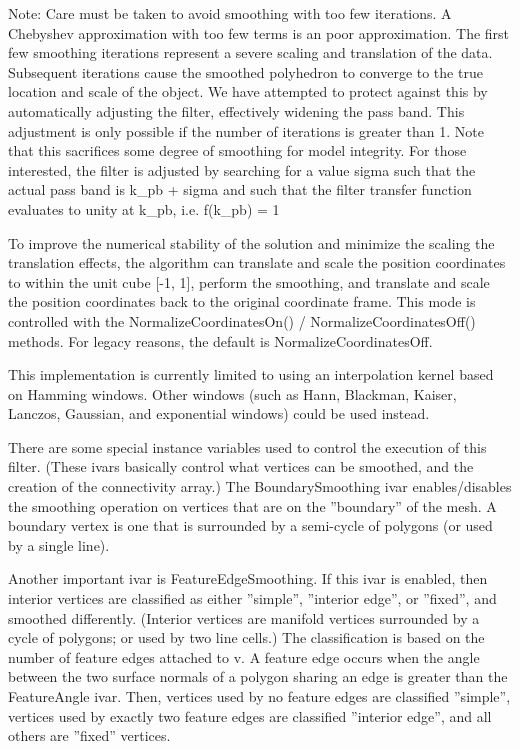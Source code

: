  Note: Care must be taken to avoid smoothing with too few iterations.
 A Chebyshev approximation with too few terms is an poor approximation.
 The first few smoothing iterations represent a severe scaling and
 translation of the data.  Subsequent iterations cause the smoothed
 polyhedron to converge to the true location and scale of the object.
 We have attempted to protect against this by automatically adjusting
 the filter, effectively widening the pass band. This adjustment is only
 possible if the number of iterations is greater than 1.  Note that this
 sacrifices some degree of smoothing for model integrity. For those
 interested, the filter is adjusted by searching for a value sigma
 such that the actual pass band is k\_pb + sigma and such that the
 filter transfer function evaluates to unity at k\_pb, i.e. f(k\_pb) = 1

 To improve the numerical stability of the solution and minimize the
 scaling the translation effects, the algorithm can translate and
 scale the position coordinates to within the unit cube [-1, 1],
 perform the smoothing, and translate and scale the position
 coordinates back to the original coordinate frame.  This mode is
 controlled with the NormalizeCoordinatesOn() /
 NormalizeCoordinatesOff() methods.  For legacy reasons, the default
 is NormalizeCoordinatesOff.

 This implementation is currently limited to using an interpolation
 kernel based on Hamming windows.  Other windows (such as Hann, Blackman,
 Kaiser, Lanczos, Gaussian, and exponential windows) could be used
 instead.

 There are some special instance variables used to control the execution
 of this filter. (These ivars basically control what vertices can be
 smoothed, and the creation of the connectivity array.) The
 BoundarySmoothing ivar enables/disables the smoothing operation on
 vertices that are on the ''boundary'' of the mesh. A boundary vertex is one
 that is surrounded by a semi-cycle of polygons (or used by a single
 line).
 
 Another important ivar is FeatureEdgeSmoothing. If this ivar is
 enabled, then interior vertices are classified as either ''simple'',
 ''interior edge'', or ''fixed'', and smoothed differently. (Interior
 vertices are manifold vertices surrounded by a cycle of polygons; or used
 by two line cells.) The classification is based on the number of feature 
 edges attached to v. A feature edge occurs when the angle between the two
 surface normals of a polygon sharing an edge is greater than the
 FeatureAngle ivar. Then, vertices used by no feature edges are classified
 ''simple'', vertices used by exactly two feature edges are classified
 ''interior edge'', and all others are ''fixed'' vertices.


